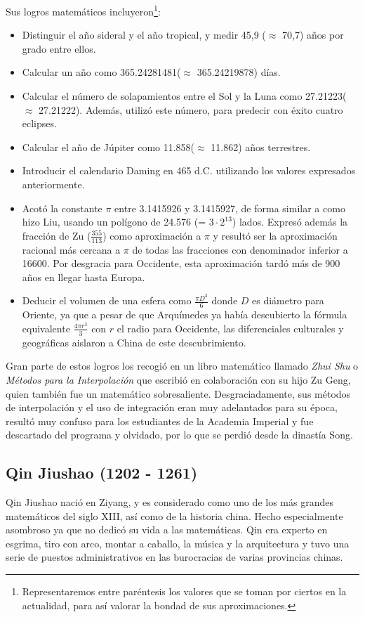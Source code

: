 \documentclass[a4paper, 11pt]{article}
\begin{document}
		Sus logros matemáticos incluyeron\footnote{Representaremos entre paréntesis los valores que se toman por ciertos
		en la actualidad, para así valorar la bondad de sus aproximaciones.}:
		\begin{itemize}
			\item Distinguir el año sideral y el año tropical, y medir 45,9 ($\approx$ 70,7) años por grado entre ellos.
			\item Calcular un año como 365.24281481($\approx$ 365.24219878) días.
			\item Calcular el número de solapamientos entre el Sol y la Luna como 27.21223($\approx$ 27.21222). Además,
			utilizó este número, para predecir con éxito cuatro eclipses.
			\item Calcular el año de Júpiter como 11.858($\approx$ 11.862) años terrestres.
			\item Introducir el calendario Daming en 465 d.C. utilizando los valores expresados anteriormente.
			\item Acotó la constante $\pi$ entre 3.1415926 y 3.1415927, de forma similar a como hizo Liu, usando un
			polígono de 24.576 (= $3 \cdot 2^13$) lados. Expresó además la fracción de Zu ($\frac{355}{113}$) como
			aproximación a $\pi$ y resultó ser la aproximación racional más cercana a $\pi$ de todas las fracciones con
			denominador inferior a 16600. Por desgracia para Occidente, esta aproximación tardó más de 900 años en llegar
			hasta Europa.
			\item Deducir el volumen de una esfera como $\frac{\pi D^3}{6}$ donde $D$ es diámetro para Oriente, ya que
			a pesar de que Arquímedes ya había descubierto la fórmula equivalente $\frac{4 \pi r^3}{3}$ con $r$ el radio
			para Occidente, las diferenciales culturales y geográficas aislaron a China de este descubrimiento.
		\end{itemize}
		
		Gran parte de estos logros los recogió en un libro matemático llamado \textit{Zhui Shu} o \textit{Métodos para la
		Interpolación} que escribió en colaboración con su hijo Zu Geng, quien también fue un matemático sobresaliente.
		Desgraciadamente, sus métodos de interpolación y el uso de integración eran muy adelantados para su época, resultó
		muy confuso para los estudiantes de la Academia Imperial y fue descartado del programa y olvidado, por lo que se
		perdió desde la dinastía Song.
	
	\subsection{Qin Jiushao (1202 - 1261)}
		Qin Jiushao nació en Ziyang, y es considerado como uno de los más grandes matemáticos del siglo XIII, así como
		de la historia china. Hecho especialmente asombroso ya que no dedicó su vida a las matemáticas. Qin era experto
		en esgrima, tiro con arco, montar a caballo, la música y la arquitectura y tuvo una serie de puestos administrativos
		en las burocracias de varias provincias chinas.
		
\end{document}
